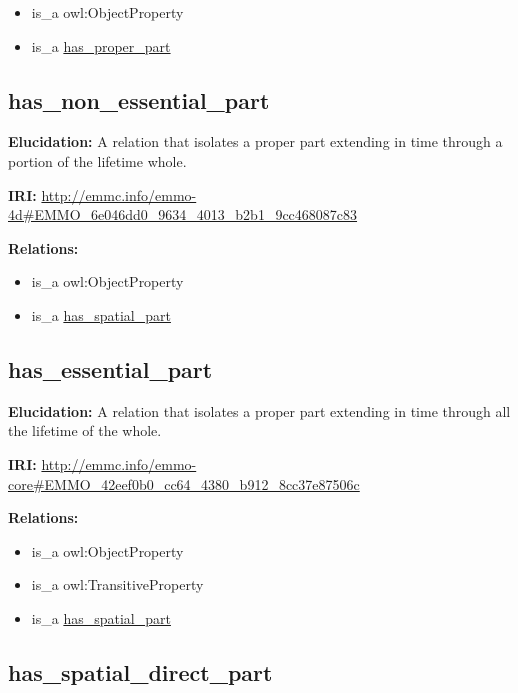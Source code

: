 \documentclass[a4paper,]{report}
\providecommand{\tightlist}{%
  \setlength{\itemsep}{0pt}\setlength{\parskip}{0pt}}
\begin{document}
\begin{itemize}
\tightlist
\item
  is\_a owl:ObjectProperty
\item
  is\_a \protect\hyperlink{has_proper_part}{has\_proper\_part}
\end{itemize}

\hypertarget{has_non_essential_part}{%
\subsection{has\_non\_essential\_part}\label{has_non_essential_part}}

\textbf{Elucidation:} A relation that isolates a proper part extending
in time through a portion of the lifetime whole.

\textbf{IRI:}
\url{http://emmc.info/emmo-4d\#EMMO_6e046dd0_9634_4013_b2b1_9cc468087c83}

\textbf{Relations:}

\begin{itemize}
\tightlist
\item
  is\_a owl:ObjectProperty
\item
  is\_a \protect\hyperlink{has_spatial_part}{has\_spatial\_part}
\end{itemize}

\hypertarget{has_essential_part}{%
\subsection{has\_essential\_part}\label{has_essential_part}}

\textbf{Elucidation:} A relation that isolates a proper part extending
in time through all the lifetime of the whole.

\textbf{IRI:}
\url{http://emmc.info/emmo-core\#EMMO_42eef0b0_cc64_4380_b912_8cc37e87506c}

\textbf{Relations:}

\begin{itemize}
\tightlist
\item
  is\_a owl:ObjectProperty
\item
  is\_a owl:TransitiveProperty
\item
  is\_a \protect\hyperlink{has_spatial_part}{has\_spatial\_part}
\end{itemize}

\hypertarget{has_spatial_direct_part}{%
\subsection{has\_spatial\_direct\_part}\label{has_spatial_direct_part}}
\end{document}
